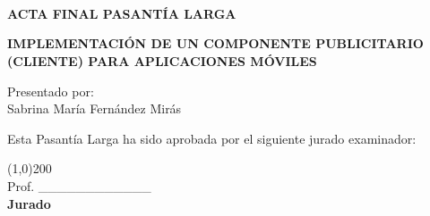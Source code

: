 \begin{center}
\par\end{center}

\begin{center}
\textbf{}\textbf{\noun{}}\\
\textbf{}\\
\textbf{}\\
\bigskip{}
\bigskip{}

\par\end{center}

\begin{center}
\bigskip{}

\par\end{center}

\noindent \begin{center}
\textbf{ACTA FINAL PASANTÍA LARGA}
\par\end{center}

\bigskip{}


\noindent \begin{center}
\textbf{\large IMPLEMENTACIÓN DE UN COMPONENTE PUBLICITARIO (CLIENTE)
PARA APLICACIONES MÓVILES}
\par\end{center}{\large \par}

\bigskip{}


\begin{center}
Presentado por:\\
Sabrina María Fernández Mirás
\par\end{center}

\bigskip{}


\begin{center}
Esta Pasantía Larga ha sido aprobada por el siguiente jurado examinador:
\par\end{center}

\bigskip{}


\begin{center}
\line(1,0){200}\\
Prof. \_\_\_\_\_\_\_\_\_\_\_\_\\
\textbf{Jurado}
\par\end{center}

